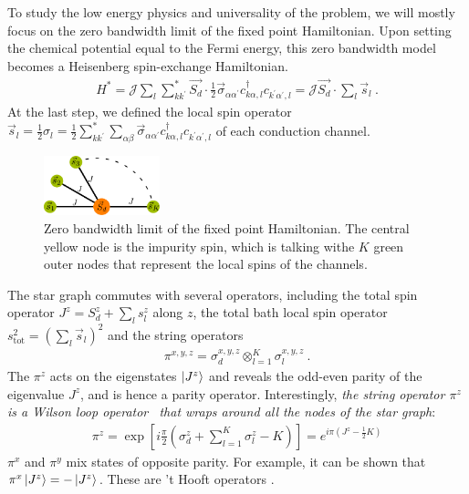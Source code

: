 \documentclass[reprint,prb,superscriptaddress]{revtex4-2}
\begin{document}
To study the low energy physics and universality of the problem, we will mostly focus on the zero bandwidth limit of the fixed point Hamiltonian. Upon setting the chemical potential equal to the Fermi energy, this zero bandwidth model becomes a Heisenberg spin-exchange Hamiltonian.
\begin{equation}\begin{aligned}
	\label{stargraph}
	H^* = {\mathcal{J}}\sum_l\sum_{kk^\prime}^* \vec{S_d}\cdot\frac{1}{2}\vec{\sigma}_{\alpha\alpha^\prime}c_{k\alpha,l}^\dagger c_{k^\prime\alpha^\prime, l} = {\mathcal{J}}\vec{S_d}\cdot\sum_l \vec{s}_l~.
\end{aligned}\end{equation}
At the last step, we defined the local spin operator \(\vec{s}_l = \frac{1}{2}\sigma_l = \frac{1}{2}\sum_{kk^\prime}^*\sum_{\alpha\beta}\vec{\sigma}_{\alpha\alpha^\prime}c_{k\alpha,l}^\dagger c_{k^\prime\alpha^\prime, l}\) of each conduction channel.
\begin{figure}[htpb]
	\centering
	\includegraphics[width=0.30\textwidth]{plt/stargraph.pdf}
	\caption{Zero bandwidth limit of the fixed point Hamiltonian. The central yellow node is the impurity spin, which is talking withe \(K\) green outer nodes that represent the local spins of the channels.}
	\label{fig:stargraph}
\end{figure}
The star graph commutes with several operators, including the total spin operator \(J^z = S_d^z + \sum_l s_l^z\) along \(z\), the total bath local spin operator \(s^2_\text{tot} = \left(\sum_l \vec s_l\right)^2\) and the string operators 
\begin{equation}\begin{aligned}
\pi^{x,y,z} = \sigma_d^{x,y,z} \otimes_{l=1}^K \sigma_l^{x,y,z}~.
\end{aligned}\end{equation}
The \(\pi^z\) acts on the eigenstates \(\ket{J^z}\) and reveals the odd-even parity of the eigenvalue \(J^z\), and is hence a parity operator. Interestingly, \textit{the string operator \(\pi^z\) is a Wilson loop operator~\cite{fradkin2013field} that wraps around all the nodes of the star graph}:
\begin{equation}\begin{aligned}
	\label{w_loop}
	\pi^z = \exp\left[i \frac{\pi}{2} \left(\sigma_d^z + \sum_{l=1}^K \sigma^z_l - K\right)\right] = e^{i \pi \left(J^z - \frac{1}{2}K\right)}
\end{aligned}\end{equation}
\(\pi^x\) and \(\pi^y\) mix states of opposite parity. For example, it can be shown that \(\pi^x \ket{J^z} = -\ket{J^z}\). These are 't Hooft operators \cite{fradkin2013field}.
\end{document}
